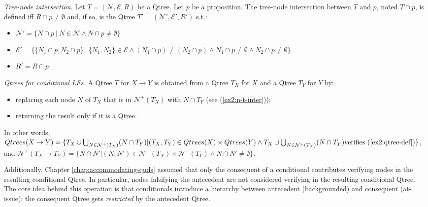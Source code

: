 \begin{exe}
	 {\textit{Tree-node intersection.} Let $T=(\mathcal{N}, \mathcal{E}, R)$ be a Qtree. Let $p$ be a proposition. The tree-node intersection between $T$ and $p$, noted $T \cap p$, is defined iff $R \cap p \neq \emptyset$ and, if so, is the Qtree $T'=(\mathcal{N}', \mathcal{E}', R')$ s.t.:
		\begin{itemize}
			\item $\mathcal{N}' = \lbrace N \cap p \ | \ N \in \mathcal{N} \wedge N \cap p \neq \emptyset\rbrace$
			\item $\mathcal{E}' = \lbrace \lbrace N_1\cap p, N_2\cap p\rbrace \ | \ \lbrace N_1, N_2\rbrace \in \mathcal{E} \wedge (N_1\cap p) \neq (N_2\cap p) \wedge N_1\cap p \neq \emptyset \wedge N_2\cap p \neq \emptyset \rbrace$
			\item $R' = R\cap p$
	\end{itemize}}
\end{exe} 

\begin{exe}
	 {\textit{Qtrees for conditional LFs.} A Qtree $T$ for $X \rightarrow Y$ is obtained from a Qtree $T_X$ for $X$ and a Qtree $T_Y$ for $Y$ by:
		\begin{itemize}
			\item replacing each node $N$ of $T_X$ that is in $\mathcal{N}^+(T_X)$ with $N \cap T_Y$ (see (\ref{ex2:n-t-inter}));
			\item returning the result only if it is a Qtree.
		\end{itemize}
		In other words, $Qtrees(X \rightarrow Y) = \lbrace T_X \cup \bigcup_{N\in \mathcal{N}^+(T_X)}(N\cap T_Y) | (T_X, T_Y) \in Qtrees(X) \times Qtrees(Y) \wedge T_X \cup \bigcup_{N\in \mathcal{N}^+(T_X)}(N\cap T_Y) \text{verifies (\ref{ex2:qtree-def})}  \rbrace$, and $\mathcal{N}^+(T_X \rightarrow T_Y) = \lbrace N\cap N' | (N, N') \in \mathcal{N}^+(T_X) \times \mathcal{N}^+(T_Y) \wedge N\cap N' \neq \emptyset \rbrace$.}
\end{exe}


Additionally, Chapter \ref{chap:accommodating-quds} assumed that only the consequent of a conditional contributes verifying nodes in the resulting conditional Qtree. In particular, nodes falsifying the antecedent are not considered verifying in the resulting conditional Qtree. The core idea behind this operation is that conditionals introduce a hierarchy between antecedent (backgrounded) and consequent (at-issue): the consequent Qtree gets \textit{restricted} by the antecedent Qtree.\\


